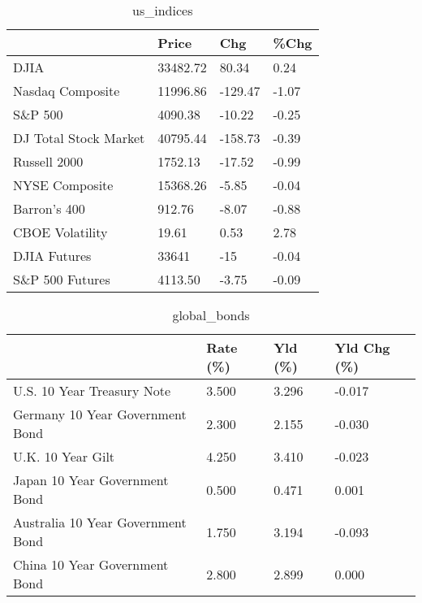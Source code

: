 \documentclass{article}%
\begin{document}
%


\begin{table}[htbp]%
\caption{us\_indices}%
\centering%
\begin{adjustbox}{width=1\textwidth}%
\begin{tabular}{llll}
\toprule
                      &    Price &     Chg &  \%Chg \\
\midrule
                 DJIA & 33482.72 &   80.34 &  0.24 \\
     Nasdaq Composite & 11996.86 & -129.47 & -1.07 \\
              S\&P 500 &  4090.38 &  -10.22 & -0.25 \\
DJ Total Stock Market & 40795.44 & -158.73 & -0.39 \\
         Russell 2000 &  1752.13 &  -17.52 & -0.99 \\
       NYSE Composite & 15368.26 &   -5.85 & -0.04 \\
         Barron's 400 &   912.76 &   -8.07 & -0.88 \\
      CBOE Volatility &    19.61 &    0.53 &  2.78 \\
         DJIA Futures &    33641 &     -15 & -0.04 \\
      S\&P 500 Futures &  4113.50 &   -3.75 & -0.09 \\
\bottomrule
\end{tabular}
%
\end{adjustbox}%
\end{table}

%


\begin{table}[htbp]%
\caption{global\_bonds}%
\centering%
\begin{adjustbox}{width=1\textwidth}%
\begin{tabular}{llll}
\toprule
                                  & Rate (\%) & Yld (\%) & Yld Chg (\%) \\
\midrule
       U.S. 10 Year Treasury Note &    3.500 &   3.296 &      -0.017 \\
  Germany 10 Year Government Bond &    2.300 &   2.155 &      -0.030 \\
                U.K. 10 Year Gilt &    4.250 &   3.410 &      -0.023 \\
    Japan 10 Year Government Bond &    0.500 &   0.471 &       0.001 \\
Australia 10 Year Government Bond &    1.750 &   3.194 &      -0.093 \\
    China 10 Year Government Bond &    2.800 &   2.899 &       0.000 \\
\bottomrule
\end{tabular}
%
\end{adjustbox}%
\end{table}
\end{document}
